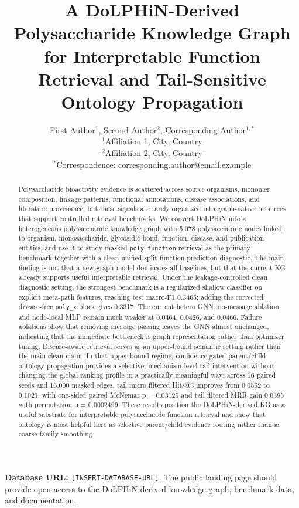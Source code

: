 \documentclass[11pt]{article}
\title{A DoLPHiN-Derived Polysaccharide Knowledge Graph for Interpretable Function Retrieval and Tail-Sensitive Ontology Propagation}
\author{First Author$^{1}$, Second Author$^{2}$, Corresponding Author$^{1,*}$\\
\small $^{1}$Affiliation 1, City, Country\\
\small $^{2}$Affiliation 2, City, Country\\
\small $^{*}$Correspondence: corresponding.author@email.example}
\date{}
\begin{document}
\maketitle

\begin{abstract}
Polysaccharide bioactivity evidence is scattered across source organisms, monomer composition, linkage patterns, functional annotations, disease associations, and literature provenance, but these signals are rarely organized into graph-native resources that support controlled retrieval benchmarks. We convert DoLPHiN into a heterogeneous polysaccharide knowledge graph with 5,078 polysaccharide nodes linked to organism, monosaccharide, glycosidic bond, function, disease, and publication entities, and use it to study masked \texttt{poly-function} retrieval as the primary benchmark together with a clean unified-split function-prediction diagnostic. The main finding is not that a new graph model dominates all baselines, but that the current KG already supports useful interpretable retrieval. Under the leakage-controlled clean diagnostic setting, the strongest benchmark is a regularized shallow classifier on explicit meta-path features, reaching test macro-F1 0.3465; adding the corrected disease-free \texttt{poly\_x} block gives 0.3317. The current hetero GNN, no-message ablation, and node-local MLP remain much weaker at 0.0464, 0.0426, and 0.0466. Failure ablations show that removing message passing leaves the GNN almost unchanged, indicating that the immediate bottleneck is graph representation rather than optimizer tuning. Disease-aware retrieval serves as an upper-bound semantic setting rather than the main clean claim. In that upper-bound regime, confidence-gated parent/child ontology propagation provides a selective, mechanism-level tail intervention without changing the global ranking profile in a practically meaningful way: across 16 paired seeds and 16,000 masked edges, tail micro filtered Hits@3 improves from 0.0552 to 0.1021, with one-sided paired McNemar p = 0.03125 and tail filtered MRR gain 0.0395 with permutation p = 0.0002499. These results position the DoLPHiN-derived KG as a useful substrate for interpretable polysaccharide function retrieval and show that ontology is most helpful here as selective parent/child evidence routing rather than as coarse family smoothing.
\end{abstract}

\noindent\textbf{Database URL:} \texttt{[INSERT-DATABASE-URL]}. The public landing page should provide open access to the DoLPHiN-derived knowledge graph, benchmark data, and documentation.
\end{document}
